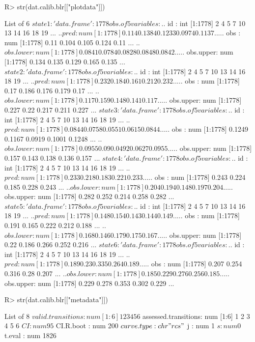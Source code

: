\documentclass[article,shortnames]{jss}
\begin{document}
\begin{Schunk}
\begin{Sinput}
R> str(dat.calib.blr[["plotdata"]])
\end{Sinput}
\begin{Soutput}
List of 6
 $ state1:'data.frame':	1778 obs. of  5 variables:
  ..$ id       : int [1:1778] 2 4 5 7 10 13 14 16 18 19 ...
  ..$ pred     : num [1:1778] 0.114 0.1384 0.1233 0.0974 0.1137 ...
  ..$ obs      : num [1:1778] 0.11 0.104 0.105 0.124 0.11 ...
  ..$ obs.lower: num [1:1778] 0.0841 0.0784 0.0828 0.0848 0.0842 ...
  ..$ obs.upper: num [1:1778] 0.134 0.135 0.129 0.165 0.135 ...
 $ state2:'data.frame':	1778 obs. of  5 variables:
  ..$ id       : int [1:1778] 2 4 5 7 10 13 14 16 18 19 ...
  ..$ pred     : num [1:1778] 0.232 0.184 0.161 0.212 0.232 ...
  ..$ obs      : num [1:1778] 0.17 0.186 0.176 0.179 0.17 ...
  ..$ obs.lower: num [1:1778] 0.117 0.159 0.148 0.141 0.117 ...
  ..$ obs.upper: num [1:1778] 0.227 0.22 0.217 0.211 0.227 ...
 $ state3:'data.frame':	1778 obs. of  5 variables:
  ..$ id       : int [1:1778] 2 4 5 7 10 13 14 16 18 19 ...
  ..$ pred     : num [1:1778] 0.0844 0.0758 0.0551 0.0615 0.0844 ...
  ..$ obs      : num [1:1778] 0.1249 0.1167 0.0919 0.1001 0.1248 ...
  ..$ obs.lower: num [1:1778] 0.0955 0.09 0.0492 0.0627 0.0955 ...
  ..$ obs.upper: num [1:1778] 0.157 0.143 0.138 0.136 0.157 ...
 $ state4:'data.frame':	1778 obs. of  5 variables:
  ..$ id       : int [1:1778] 2 4 5 7 10 13 14 16 18 19 ...
  ..$ pred     : num [1:1778] 0.233 0.218 0.183 0.221 0.233 ...
  ..$ obs      : num [1:1778] 0.243 0.224 0.185 0.228 0.243 ...
  ..$ obs.lower: num [1:1778] 0.204 0.194 0.148 0.197 0.204 ...
  ..$ obs.upper: num [1:1778] 0.282 0.252 0.214 0.258 0.282 ...
 $ state5:'data.frame':	1778 obs. of  5 variables:
  ..$ id       : int [1:1778] 2 4 5 7 10 13 14 16 18 19 ...
  ..$ pred     : num [1:1778] 0.148 0.154 0.143 0.144 0.149 ...
  ..$ obs      : num [1:1778] 0.191 0.165 0.222 0.212 0.188 ...
  ..$ obs.lower: num [1:1778] 0.168 0.146 0.179 0.175 0.167 ...
  ..$ obs.upper: num [1:1778] 0.22 0.186 0.266 0.252 0.216 ...
 $ state6:'data.frame':	1778 obs. of  5 variables:
  ..$ id       : int [1:1778] 2 4 5 7 10 13 14 16 18 19 ...
  ..$ pred     : num [1:1778] 0.189 0.23 0.335 0.264 0.189 ...
  ..$ obs      : num [1:1778] 0.207 0.254 0.316 0.28 0.207 ...
  ..$ obs.lower: num [1:1778] 0.185 0.229 0.276 0.256 0.185 ...
  ..$ obs.upper: num [1:1778] 0.229 0.278 0.353 0.302 0.229 ...
\end{Soutput}
\begin{Sinput}
R> str(dat.calib.blr[["metadata"]])
\end{Sinput}
\begin{Soutput}
List of 8
 $ valid.transitions   : num [1:6] 1 2 3 4 5 6
 $ assessed.transitions: num [1:6] 1 2 3 4 5 6
 $ CI                  : num 95
 $ CI.R.boot           : num 200
 $ curve.type          : chr "rcs"
 $ j                   : num 1
 $ s                   : num 0
 $ t.eval              : num 1826
\end{Soutput}
\end{Schunk}
\end{document}
